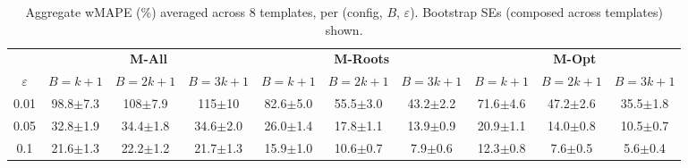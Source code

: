 \providecommand{\pmstd}[1]{{\scriptsize $\pm$#1}}

\begin{table}[t]
\centering
\small
\caption{Aggregate wMAPE (\%) averaged across 8 templates, per (config, $B$, $\varepsilon$). Bootstrap SEs (composed across templates) shown.}
\label{tab:agent_aggregate_wmape}
\begin{tabular}{c|ccc|ccc|ccc}
\toprule
& \multicolumn{3}{c|}{\textbf{M-All}} & \multicolumn{3}{c|}{\textbf{M-Roots}} & \multicolumn{3}{c}{\textbf{M-Opt}} \\
$\varepsilon$ & $B=k+1$ & $B=2k+1$ & $B=3k+1$ & $B=k+1$ & $B=2k+1$ & $B=3k+1$ & $B=k+1$ & $B=2k+1$ & $B=3k+1$ \\
\midrule
0.01 & 98.8\pmstd{7.3} & 108\pmstd{7.9} & 115\pmstd{10} & 82.6\pmstd{5.0} & 55.5\pmstd{3.0} & 43.2\pmstd{2.2} & 71.6\pmstd{4.6} & 47.2\pmstd{2.6} & 35.5\pmstd{1.8} \\
0.05 & 32.8\pmstd{1.9} & 34.4\pmstd{1.8} & 34.6\pmstd{2.0} & 26.0\pmstd{1.4} & 17.8\pmstd{1.1} & 13.9\pmstd{0.9} & 20.9\pmstd{1.1} & 14.0\pmstd{0.8} & 10.5\pmstd{0.7} \\
0.1 & 21.6\pmstd{1.3} & 22.2\pmstd{1.2} & 21.7\pmstd{1.3} & 15.9\pmstd{1.0} & 10.6\pmstd{0.7} & 7.9\pmstd{0.6} & 12.3\pmstd{0.8} & 7.6\pmstd{0.5} & 5.6\pmstd{0.4} \\
\bottomrule
\end{tabular}
\end{table}
